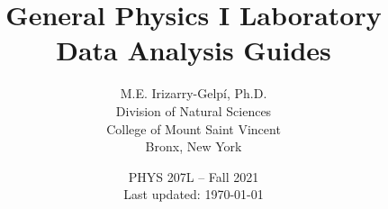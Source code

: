 \documentclass[letterpaper,11pt]{report}
\begin{document}
%
\title{\Huge{General Physics I Laboratory \\ Data Analysis Guides}}
\author{M.E. Irizarry-Gelp\'{i}, Ph.D. \\ Division of Natural Sciences \\ College of Mount Saint Vincent \\ Bronx, New York}
\date{PHYS 207L -- Fall 2021 \\ Last updated: {\today} {\currenttime}}
%
\maketitle
\tableofcontents
%

%
%



%
%



%
%


%
%


%
%

%
\appendix
% 

% 
% 
%
\end{document}
